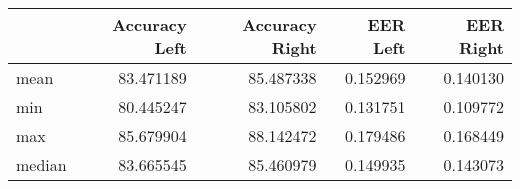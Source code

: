 \begin{tabular}{lrrrr}
\toprule
{} &  Accuracy Left &  Accuracy Right &  EER Left &  EER Right \\
\midrule
mean   &      83.471189 &       85.487338 &  0.152969 &   0.140130 \\
min    &      80.445247 &       83.105802 &  0.131751 &   0.109772 \\
max    &      85.679904 &       88.142472 &  0.179486 &   0.168449 \\
median &      83.665545 &       85.460979 &  0.149935 &   0.143073 \\
\bottomrule
\end{tabular}
